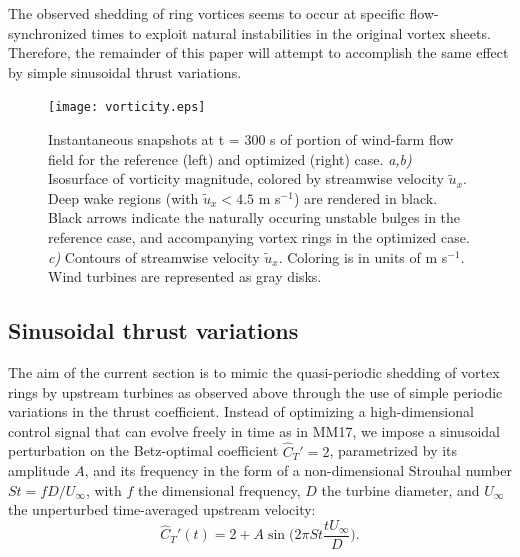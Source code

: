 \documentclass[wes, manuscript]{copernicus}
\newcommand{\cthat}{\widehat{C}_T'}
\begin{document}
The observed shedding of ring vortices seems to occur at specific flow-synchronized times to exploit natural instabilities in the original vortex sheets. Therefore, the remainder of this paper will attempt to accomplish the same effect by simple sinusoidal thrust variations. 

\begin{figure}
	\centering
	\texttt{[image: vorticity.eps]}
	\caption{Instantaneous snapshots at t = 300 s of portion of wind-farm flow field for the reference (left) and optimized (right) case. \emph{a,b) } Isosurface of vorticity magnitude, colored by streamwise velocity $\widetilde{u}_x$. Deep wake regions (with $\widetilde{u}_x < 4.5$ m s$^{-1}$) are rendered in black. Black arrows indicate the naturally occuring unstable bulges in the reference case, and accompanying vortex rings in the optimized case. \emph{c)} Contours of streamwise velocity $\widetilde{u}_x$. Coloring is in units of m s$^{-1}$. Wind turbines are represented as gray disks. \label{fig:vorticity_windfarm}}
\end{figure}


\subsection{Sinusoidal thrust variations}\label{sec:opt_sinus}
The aim of the current section is to mimic the quasi-periodic shedding of vortex rings by upstream turbines as observed above through the use of simple periodic variations in the thrust coefficient. Instead of optimizing a high-dimensional control signal that can evolve freely in time as in MM17, we impose a sinusoidal perturbation on the Betz-optimal coefficient $\cthat = 2$, parametrized by its amplitude $A$, and its frequency in the form of a non-dimensional Strouhal number $St = f D/ U_\infty$, with $f$ the dimensional frequency, $D$ the turbine diameter, and $U_\infty$ the unperturbed time-averaged upstream velocity:
\begin{equation}
\cthat(t) = 2 + A \sin \bigg(2\pi St \frac{t U_\infty}{D} \bigg).\label{eq:define_thrust}
\end{equation}
\end{document}
